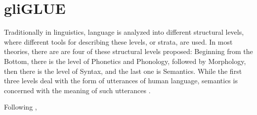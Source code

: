 
\label{chap:5_dataset}

\section{gliGLUE}

Traditionally in linguistics, language is analyzed into different structural levels, where 
different tools for describing these levels, or strata, are used.
In most theories, there are are four of these structural levels proposed:
Beginning from the Bottom, there is the level of Phonetics and Phonology, followed by Morphology, 
then there is the level of Syntax, and the last one is Semantics.
While the first three levels deal with the form of utterances of human language, semantics is 
concerned with the meaning of such utterances \citep[p.~4ff.]{kracht2007introduction}.



Following \cite{wang2018glue}, 

